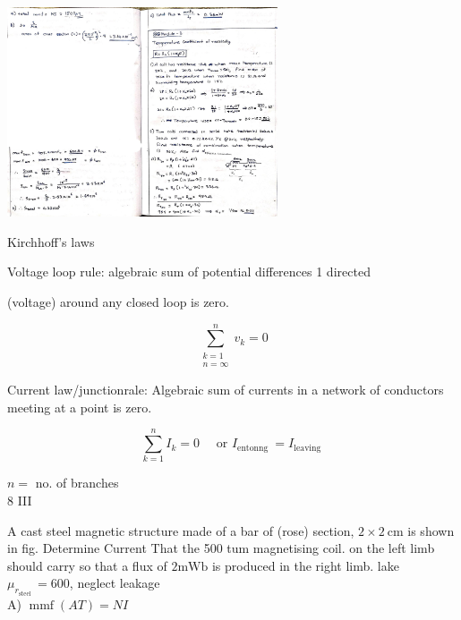 \documentclass[12pt, a4paper]{article}
\newcommand{\figwidth}{8cm}
\begin{document}
\begin{center}
	\includegraphics[max width=\figwidth]{2024_06_15_ae1c13e212c06c234cc4g-06}
\end{center}

Kirchhoff's laws

Voltage loop rule: algebraic sum of potential differences 1 directed

(voltage) around any closed loop is zero.

$$
	\sum_{\substack{k=1 \\ n=\infty}}^{n} v_{k}=0
$$

Current law/junctionrale: Algebraic sum of currents in a network of conductors meeting at a point is zero.

$$
	\sum_{k=1}^{n} I_{k}=0 \quad \text { or } I_{\text {entonng }}=I_{\text {leaving }}
$$

$n=$ no. of branches\\
8 III

A cast steel magnetic structure made of a bar of (rose) section, $2 \times 2 \mathrm{~cm}$ is shown in fig. Determine Current That the 500 tum magnetising coil. on the left limb should carry so that a flux of $2 \mathrm{mWb}$ is produced in the right limb. lake $\mu_{r_{\text {steel }}}=600$, neglect leakage\\
A) $\operatorname{mmf}(A T)=N I$
\end{document}
